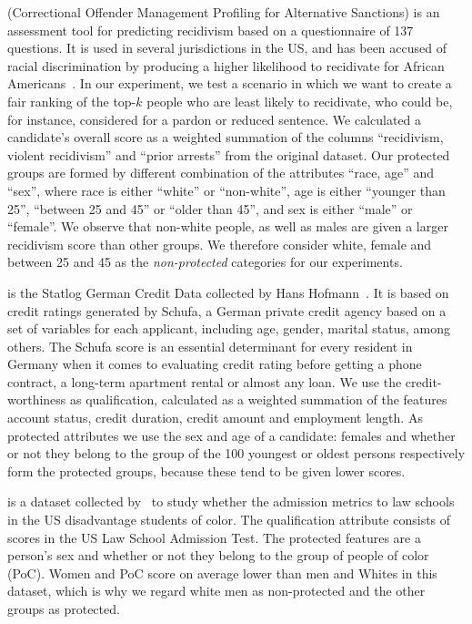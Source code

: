  (Correctional Offender Management Profiling for Alternative Sanctions) is an assessment tool for predicting recidivism based on a questionnaire of 137 questions. It is used in several jurisdictions in the US, and has been accused of racial discrimination by producing a higher likelihood to recidivate for African Americans~\cite{angwin_2016_machine}.
%
In our experiment, we test a scenario in which we want to create a fair ranking of the top-$k$ people who are least likely to recidivate, who could be, for instance, considered for a pardon or reduced sentence.
%
We calculated a candidate's overall score as a weighted summation of the columns ``recidivism, violent recidivism'' and ``prior arrests'' from the original dataset.
%
Our protected groups are formed by different combination of the attributes ``race, age'' and ``sex'', where race is either ``white'' or ``non-white'', age is either ``younger than 25'', ``between 25 and 45'' or ``older than 45'', and sex is either ``male'' or ``female''.
%
We observe that non-white people, as well as males are given a larger recidivism score than other groups.
%
We therefore consider white, female and between 25 and 45 as the \emph{non-protected} categories for our experiments.

 is the Statlog German Credit Data collected by Hans Hofmann~\cite{lichman_2013_uci}.
%
It is based on credit ratings generated by Schufa, a German private credit agency based on a set of variables for each applicant, including age, gender, marital status, among others. The Schufa score is an essential determinant for every resident in Germany when it comes to evaluating credit rating before getting a phone contract, a long-term apartment rental or almost any loan.
%
We use the credit-worthiness as qualification, calculated as a weighted summation of the features account status, credit duration, credit amount and employment length. 
As protected attributes we use the sex and age of a candidate: females and whether or not they belong to the group of the 100 youngest or oldest persons respectively form the protected groups, because these tend to be given lower scores.

 is a dataset collected by~\citet{wightman1998lsac} to study whether the admission metrics to law schools in the US disadvantage students of color. 
%
The qualification attribute consists of scores in the US Law School Admission Test.
%
The protected features are a person's sex and whether or not they belong to the group of people of color (PoC).
%
Women and PoC score on average lower than men and Whites in this dataset, which is why we regard white men as non-protected and the other groups as protected.


